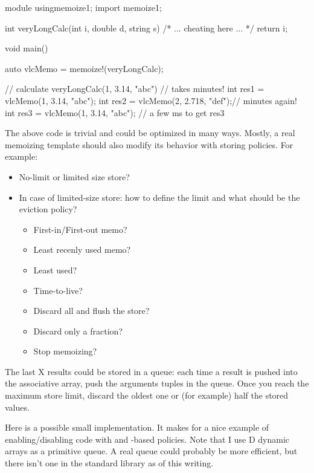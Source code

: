\begin{dcode}
module usingmemoize1;
import memoize1;

int veryLongCalc(int i, double d, string s) 
{
	/* ... cheating here ... */
	return i;
}

void main()
{
    auto vlcMemo = memoize!(veryLongCalc);

   // calculate veryLongCalc(1, 3.14, "abc")
   // takes minutes!
   int res1 = vlcMemo(1, 3.14, "abc"); 
   int res2 = vlcMemo(2, 2.718, "def");// minutes again!
   int res3 = vlcMemo(1, 3.14, "abc"); // a few ms to get res3
}
\end{dcode}

The above code is trivial and could be optimized in many ways. Mostly, a real memoizing template should also modify its behavior with storing policies. For example:

\begin{itemize}
\item No-limit or limited size store? 
\item In case of limited-size store: how to define the limit and what should be the eviction policy?
\begin{itemize}
\item First-in/First-out memo?
\item Least recenly used memo?
\item Least used?
\item Time-to-live?
\item Discard all and flush the store?
\item Discard only a fraction?
\item Stop memoizing?
\end{itemize}
\end{itemize}

The last X results could be stored in a queue: each time a result is pushed into the associative array, push the arguments tuples in the queue. Once you reach the maximum store limit, discard the oldest one or (for example) half the stored values.

Here is a possible small implementation. It makes for a nice example of enabling/disabling code with  and -based policies. Note that I use D dynamic arrays as a primitive queue. A real queue could probably be more efficient, but there isn't one in the standard library as of this writing.

